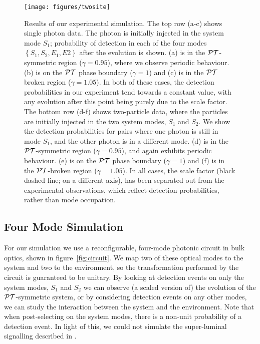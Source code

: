 \begin{figure}[p]
  \centering
  \texttt{[image: figures/twosite]}
  \caption[Results of simulation]
    {Results of our experimental simulation. The top row (a-c) shows
    single photon data. The photon is initially injected in the system mode
    \(S_1\); probability of detection in each of the four modes \(\left\{S_1,
    S_2, E_1, E2\right\}\) after the evolution is shown. (a) is in the
    \(\mathcal{PT}{}\)-symmetric region (\(\gamma=0.95\)), where we observe periodic
    behaviour. (b) is on the \(\mathcal{PT}{}\) phase boundary (\(\gamma=1\)) and (c) is
    in the \(\mathcal{PT}{}\) broken region (\(\gamma=1.05\)). In both of these cases,
    the detection probabilities in our
    experiment tend towards a constant value, with any evolution after this
    point being purely due to the scale factor. The bottom row (d-f) shows
    two-particle data, where the particles are initially injected in the two
    system modes, \(S_1\) and \(S_2\). We show the detection probabilities for
    pairs where one photon is still in mode \(S_1\), and the other photon is in
    a different mode. (d) is in the \(\mathcal{PT}{}\)-symmetric region
    (\(\gamma=0.95\)), and again exhibits periodic behaviour. (e) is on the
    \(\mathcal{PT}{}\) phase boundary (\(\gamma=1\)) and (f) is in the \(\mathcal{PT}{}\)-broken
    region (\(\gamma=1.05\)). In all cases, the scale factor (black dashed
    line; on a different axis), has been separated out from the experimental
    observations, which reflect detection probabilities, rather than mode
    occupation.}
  \label{fig:twosite}
\end{figure}

\subsection{Four Mode Simulation}
\label{sec:FourMode}
For our simulation we use a reconfigurable, four-mode photonic circuit in bulk
optics, shown in figure~\ref{fig:circuit}. We map two of these optical
modes to the system and two to the environment, so the transformation performed
by the circuit is guaranteed to be unitary. By looking at detection events on
only the system modes, \(S_1\) and \(S_2\) we can observe (a scaled version of)
the evolution of the \(\mathcal{PT}{}\)-symmetric system, or by considering detection
events on any other modes, we can study the interaction between the system and
the environment. Note that when post-selecting on the system modes, there is a
non-unit probability of a detection event. In light of this, we could not
simulate the super-luminal signalling described in \cite{lee-prl-112-130404}.

